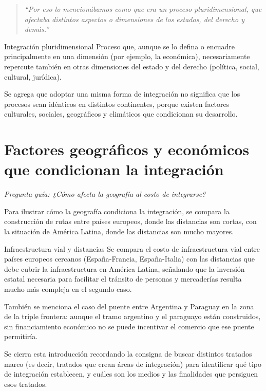 \documentclass[12pt,oneside]{book}
\newenvironment{citadocente}
  {\begin{quote}\itshape\RaggedRight}
  {\end{quote}}
\begin{document}
\begin{citadocente}
``Por eso lo mencionábamos como que era un proceso pluridimensional, que afectaba distintos aspectos o dimensiones de los estados, del derecho y demás.''
\end{citadocente}

\begin{definition}{Integración pluridimensional}
Proceso que, aunque se lo defina o encuadre principalmente en una dimensión (por ejemplo, la económica), necesariamente repercute también en otras dimensiones del estado y del derecho (política, social, cultural, jurídica).
\end{definition}

Se agrega que adoptar una misma forma de integración no significa que los procesos sean idénticos en distintos continentes, porque existen factores culturales, sociales, geográficos y climáticos que condicionan su desarrollo.

\section{Factores geográficos y económicos que condicionan la integración}

\textit{Pregunta guía: ¿Cómo afecta la geografía al costo de integrarse?}

Para ilustrar cómo la geografía condiciona la integración, se compara la construcción de rutas entre países europeos, donde las distancias son cortas, con la situación de América Latina, donde las distancias son mucho mayores.

\begin{example}{Infraestructura vial y distancias}
Se compara el costo de infraestructura vial entre países europeos cercanos (España-Francia, España-Italia) con las distancias que debe cubrir la infraestructura en América Latina, señalando que la inversión estatal necesaria para facilitar el tránsito de personas y mercaderías resulta mucho más compleja en el segundo caso.

También se menciona el caso del puente entre Argentina y Paraguay en la zona de la triple frontera: aunque el tramo argentino y el paraguayo están construidos, sin financiamiento económico no se puede incentivar el comercio que ese puente permitiría.
\end{example}

Se cierra esta introducción recordando la consigna de buscar distintos tratados marco (es decir, tratados que crean áreas de integración) para identificar qué tipo de integración establecen, y cuáles son los medios y las finalidades que persiguen esos tratados.
\end{document}
